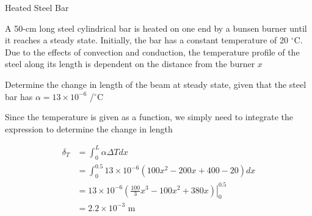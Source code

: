 \documentclass[
10pt,
a4paper,
openany,
svgnames,
]{book}
\begin{document}
\begin{example} Heated Steel Bar

  A 50-cm long steel cylindrical bar is heated on one end by a bunsen burner until it reaches a steady state. Initially, the bar has a constant temperature of 20 $^{\circ}$C. Due to the effects of convection and conduction, the temperature profile of the steel along its length is dependent on the distance from the burner $x$

  \begin{figure}[H]
    \centering
  \end{figure}
  
  Determine the change in length of the beam at steady state, given that the steel bar has $\alpha = 13 \times 10^{-6}$ /$^{\circ}$C
\end{example}
\begin{solution}

  Since the temperature is given as a function, we simply need to integrate the expression to determine the change in length

  \begin{align*}
    \delta_T &= \int_0^L \alpha \Delta T dx \\
             &= \int_0^{0.5} 13 \times 10^{-6} (100x^2 - 200x + 400 - 20) dx \\
             &= 13 \times 10^{-6} \left. \left( \frac{100}{3} x^3 - 100 x^2 + 380 x \right) \right|_0^{0.5} \\
             &= 2.2 \times 10^{-3} \text{ m}
  \end{align*}
\end{solution}
  
\end{document}
